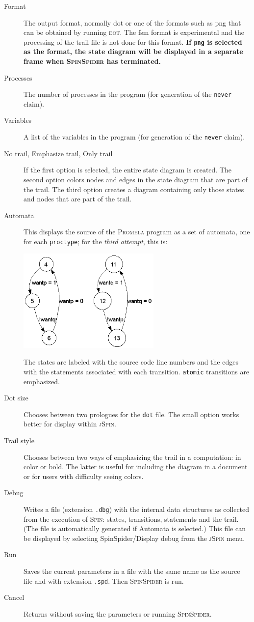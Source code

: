 \documentclass[11pt]{article}
\newcommand{\spn}{\textsc{Spin}}
\newcommand{\prm}{\textsc{Promela}}
\newcommand{\js}{\textsc{jSpin}}
\newcommand{\spd}{\textsc{SpinSpider}}
\newcommand{\dt}{\textsc{dot}}
\newcommand{\dtf}{\texttt{dot}}
\newcommand{\p}[1]{\texttt{#1}}
\newcommand{\bu}[1]{\textsf{#1}}
\begin{document}
\begin{description}
\item[\bu{Format}] The output format, normally \bu{dot} or one of the formats
such as \bu{png} that can be obtained by running \dt{}. The \bu{fsm} format is
experimental and the processing of the trail file is not done for this format.
\textbf{If \p{png} is selected as the format, the state diagram will be displayed in a
separate frame when \spd{} has terminated.}
\item[\bu{Processes}] The number of processes in the program (for generation of
the \p{never} claim).
\item[\bu{Variables}] A list of the variables in the program (for generation of
the \p{never} claim).
\item[\bu{No trail}, \bu{Emphasize trail}, \bu{Only trail}] If the first option
is selected, the entire state diagram is created. The second option colors nodes
and edges in the state diagram that are part of the trail. The third option
creates a diagram containing only those states and nodes that are part of the
trail.
\item[\bu{Automata}] This displays the source of the \prm{} program as a set
of automata, one for each \p{proctype}; for the \emph{third attempt}, this is:
\begin{center}
\includegraphics[width=7cm,keepaspectratio=true]{third-automata.png}
\end{center}
The states are labeled with the source code line numbers and the edges with
the statements associated with each transition. \p{atomic} transitions
are emphasized.
\item[\bu{Dot size}] Chooses between two prologues for the \dtf{} file. The small
option works better for display within \js{}.
\item[\bu{Trail style}] Chooses between two ways of emphasizing the trail in a
computation: in color or bold. The latter is useful for including the diagram in
a document or for users with difficulty seeing colors.
\item[\bu{Debug}] Writes a file (extension \p{.dbg}) with the internal data
structures as collected from the execution of \spn{}: states, transitions,
statements and the trail. 
(The file is automatically generated if \bu{Automata} is selected.) 
This file can be displayed by selecting
\bu{SpinSpider/Display debug} from the \js{} menu.
\item[\bu{Run}] Saves the current parameters in a file with the same name as the
source file and with extension \p{.spd}. Then \spd{} is run.
\item[\bu{Cancel}] Returns without saving the parameters or running \spd{}.
\end{description}
\end{document}
